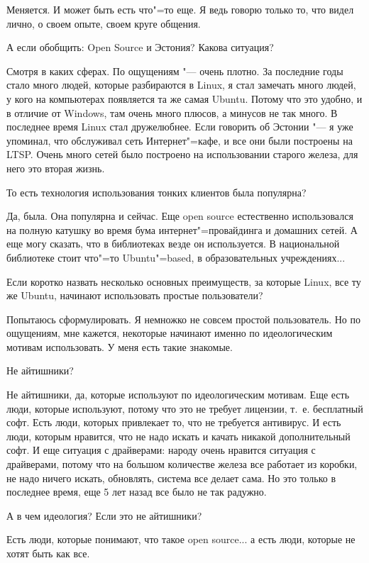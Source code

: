 \documentclass[10pt, a5paper]{article}
\begin{document}
\a Меняется. И может быть есть что"=то еще. Я ведь говорю только то, что видел лично, о своем опыте, своем круге общения.

\q А если обобщить: Open Source и Эстония? Какова ситуация?

\a Смотря в каких сферах. По ощущениям "--- очень плотно. За последние годы стало много людей, которые разбираются в Linux, я стал замечать много людей, у кого на компьютерах появляется та же самая Ubuntu. Потому что это удобно, и в отличие от Windows, там очень много плюсов, а минусов не так много. В последнее время Linux стал дружелюбнее. Если говорить об Эстонии "--- я уже упоминал, что обслуживал сеть Интернет"=кафе, и все они были построены на LTSP. Очень много сетей было построено на использовании старого железа, для него это вторая жизнь. 

\q То есть технология использования тонких клиентов была популярна?

\a Да, была. Она популярна и сейчас. Еще open source естественно использовался на полную катушку во время бума интернет"=провайдинга и домашних сетей. А еще могу сказать, что в библиотеках везде он используется. В национальной библиотеке стоит что"=то Ubuntu"=based, в образовательных учреждениях...

\q Если коротко назвать несколько основных преимуществ, за которые Linux, все ту же Ubuntu, начинают использовать простые пользователи?

\a Попытаюсь сформулировать. Я немножко не совсем простой пользователь. Но по ощущениям, мне кажется, некоторые начинают именно по идеологическим мотивам использовать. У меня есть такие знакомые.

\q Не айтишники?

\a Не айтишники, да, которые используют по идеологическим мотивам. Еще есть люди, которые используют, потому что это не требует лицензии, т.~е. бесплатный софт. Есть люди, которых привлекает то, что не требуется антивирус. И есть люди, которым нравится, что не надо искать и качать никакой дополнительный софт. И еще ситуация с драйверами: народу очень нравится ситуация с драйверами, потому что на большом количестве железа все работает из коробки, не надо ничего искать, обновлять, система все делает сама. Но это только в последнее время, еще 5 лет назад все было не так радужно.

\q А в чем идеология? Если это не айтишники?

\a Есть люди, которые понимают, что такое open source... а есть люди, которые не хотят быть как все. 
\end{document}
